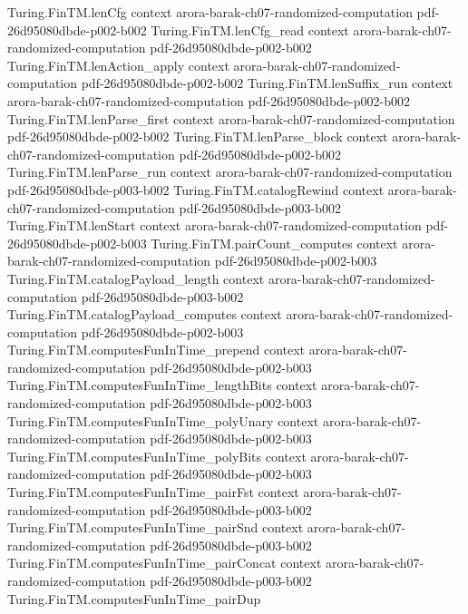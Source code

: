 \begin{theorem}
\proofstep
  {Turing.FinTM.lenCfg}
  {context}
  {arora-barak-ch07-randomized-computation}
  {pdf-26d95080dbde-p002-b002}
\proofstep
  {Turing.FinTM.lenCfg_read}
  {context}
  {arora-barak-ch07-randomized-computation}
  {pdf-26d95080dbde-p002-b002}
\proofstep
  {Turing.FinTM.lenAction_apply}
  {context}
  {arora-barak-ch07-randomized-computation}
  {pdf-26d95080dbde-p002-b002}
\proofstep
  {Turing.FinTM.lenSuffix_run}
  {context}
  {arora-barak-ch07-randomized-computation}
  {pdf-26d95080dbde-p002-b002}
\proofstep
  {Turing.FinTM.lenParse_first}
  {context}
  {arora-barak-ch07-randomized-computation}
  {pdf-26d95080dbde-p002-b002}
\proofstep
  {Turing.FinTM.lenParse_block}
  {context}
  {arora-barak-ch07-randomized-computation}
  {pdf-26d95080dbde-p002-b002}
\proofstep
  {Turing.FinTM.lenParse_run}
  {context}
  {arora-barak-ch07-randomized-computation}
  {pdf-26d95080dbde-p003-b002}
\proofstep
  {Turing.FinTM.catalogRewind}
  {context}
  {arora-barak-ch07-randomized-computation}
  {pdf-26d95080dbde-p003-b002}
\proofstep
  {Turing.FinTM.lenStart}
  {context}
  {arora-barak-ch07-randomized-computation}
  {pdf-26d95080dbde-p002-b003}
\proofstep
  {Turing.FinTM.pairCount_computes}
  {context}
  {arora-barak-ch07-randomized-computation}
  {pdf-26d95080dbde-p002-b003}
\proofstep
  {Turing.FinTM.catalogPayload_length}
  {context}
  {arora-barak-ch07-randomized-computation}
  {pdf-26d95080dbde-p003-b002}
\proofstep
  {Turing.FinTM.catalogPayload_computes}
  {context}
  {arora-barak-ch07-randomized-computation}
  {pdf-26d95080dbde-p002-b003}
\proofstep
  {Turing.FinTM.computesFunInTime_prepend}
  {context}
  {arora-barak-ch07-randomized-computation}
  {pdf-26d95080dbde-p002-b003}
\proofstep
  {Turing.FinTM.computesFunInTime_lengthBits}
  {context}
  {arora-barak-ch07-randomized-computation}
  {pdf-26d95080dbde-p002-b003}
\proofstep
  {Turing.FinTM.computesFunInTime_polyUnary}
  {context}
  {arora-barak-ch07-randomized-computation}
  {pdf-26d95080dbde-p002-b003}
\proofstep
  {Turing.FinTM.computesFunInTime_polyBits}
  {context}
  {arora-barak-ch07-randomized-computation}
  {pdf-26d95080dbde-p002-b003}
\proofstep
  {Turing.FinTM.computesFunInTime_pairFst}
  {context}
  {arora-barak-ch07-randomized-computation}
  {pdf-26d95080dbde-p003-b002}
\proofstep
  {Turing.FinTM.computesFunInTime_pairSnd}
  {context}
  {arora-barak-ch07-randomized-computation}
  {pdf-26d95080dbde-p003-b002}
\proofstep
  {Turing.FinTM.computesFunInTime_pairConcat}
  {context}
  {arora-barak-ch07-randomized-computation}
  {pdf-26d95080dbde-p003-b002}
\proofstep
  {Turing.FinTM.computesFunInTime_pairDup}

\end{theorem}
